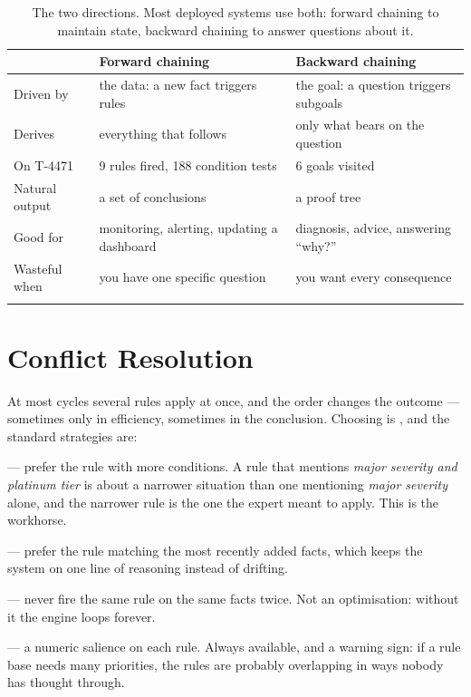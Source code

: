\smallskip
\noindent\begin{longtable}{@{}L{3.0cm}L{5.8cm}L{6.0cm}@{}}
\toprule
{}
 & \textbf{Forward chaining} & \textbf{Backward chaining} \\
\midrule
\endhead
Driven by & the data: a new fact triggers rules & the goal: a question triggers
subgoals \\
Derives & everything that follows & only what bears on the question \\
On T-4471 & 9 rules fired, 188 condition tests & 6 goals visited \\
Natural output & a set of conclusions & a proof tree \\
Good for & monitoring, alerting, updating a dashboard & diagnosis, advice,
answering ``why?'' \\
Wasteful when & you have one specific question & you want every consequence \\
\bottomrule
\caption{The two directions. Most deployed systems use both: forward chaining to
maintain state, backward chaining to answer questions about
it.}\label{tab:chaining}
\end{longtable}

\section{Conflict Resolution}

At most cycles several rules apply at once, and the order changes the outcome ---
sometimes only in efficiency, sometimes in the conclusion. Choosing is , and the standard strategies are:

\begin{tight}
  \item {} --- prefer the rule with more conditions. A rule that
        mentions \emph{major severity and platinum tier} is about a narrower
        situation than one mentioning \emph{major severity} alone, and the narrower
        rule is the one the expert meant to apply. This is the workhorse.
  \item {} --- prefer the rule matching the most recently added facts,
        which keeps the system on one line of reasoning instead of drifting.
  \item {} --- never fire the same rule on the same facts twice. Not
        an optimisation: without it the engine loops forever.
  \item {} --- a numeric salience on each rule. Always
        available, and a warning sign: if a rule base needs many priorities, the
        rules are probably overlapping in ways nobody has thought through.
\end{tight}

